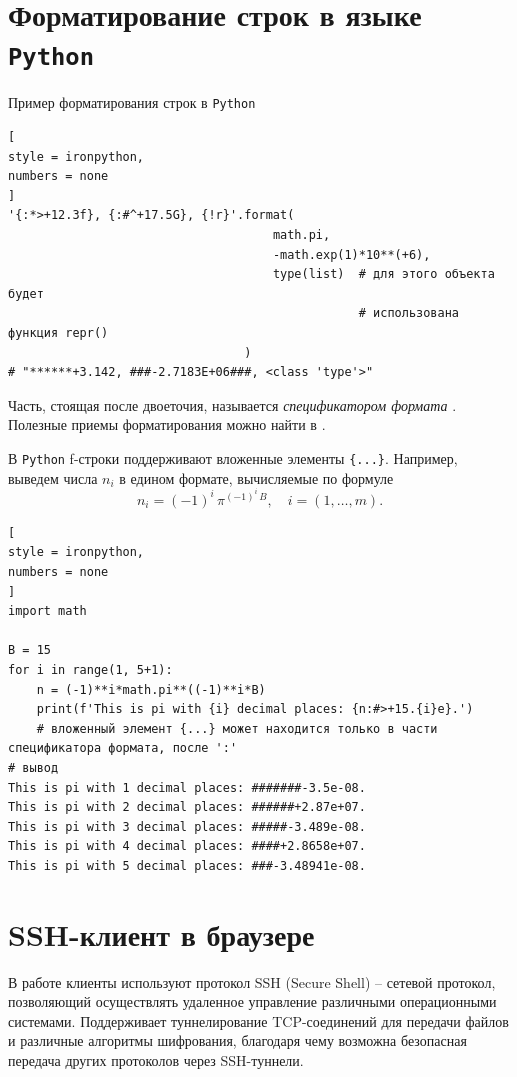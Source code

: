 \documentclass[%
	11pt,
	a4paper,
	utf8,
		]{article}
\begin{document}
\section{Форматирование строк в языке \texttt{Python}}

Пример форматирования строк в \texttt{Python} 

\begin{lstlisting}[
style = ironpython,
numbers = none
]
'{:*>+12.3f}, {:#^+17.5G}, {!r}'.format(
                                     math.pi,
                                     -math.exp(1)*10**(+6),
                                     type(list)  # для этого объекта будет
                                                 # использована функция repr()
                                 )
# "******+3.142, ###-2.7183E+06###, <class 'type'>"
\end{lstlisting}

Часть, стоящая после двоеточия, называется \emph{спецификатором формата} \cite[]{ramalho:python-2016}. Полезные приемы форматирования можно найти в \cite{prohorenok:python-2016}.

В \texttt{Python} f-строки поддерживают вложенные элементы \verb|{...}|. Например, выведем числа $ n_i $ в едином формате, вычисляемые по формуле
$$
    n_i = (-1)^{i} \, \pi^{(-1)^i\,B}, \quad i = (1, \dots, m).
$$
\begin{lstlisting}[
style = ironpython,
numbers = none
]
import math

B = 15
for i in range(1, 5+1):
    n = (-1)**i*math.pi**((-1)**i*B)
    print(f'This is pi with {i} decimal places: {n:#>+15.{i}e}.')
    # вложенный элемент {...} может находится только в части спецификатора формата, после ':'
# вывод
This is pi with 1 decimal places: #######-3.5e-08.
This is pi with 2 decimal places: ######+2.87e+07.
This is pi with 3 decimal places: #####-3.489e-08.
This is pi with 4 decimal places: ####+2.8658e+07.
This is pi with 5 decimal places: ###-3.48941e-08.
\end{lstlisting}

\section{SSH-клиент в браузере}

В работе клиенты используют протокол SSH (Secure Shell) -- сетевой протокол, позволяющий осуществлять удаленное управление различными операционными системами. Поддерживает туннелирование TCP-соединений для передачи файлов и различные алгоритмы шифрования, благодаря чему возможна безопасная передача других протоколов через SSH-туннели.
\end{document}
